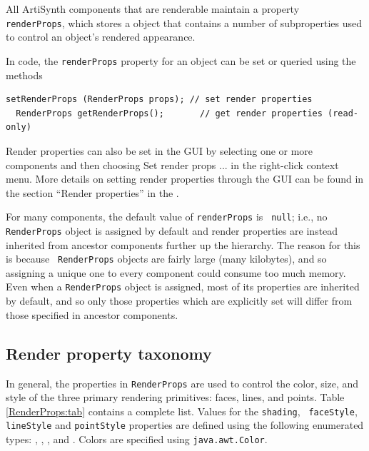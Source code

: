 All ArtiSynth components that are renderable maintain a property {\tt
renderProps}, which stores a
 object that contains a number
of subproperties used to control an object's rendered appearance.

In code, the {\tt renderProps} property for an object can be set or
queried using the methods
\begin{lstlisting}[]
  setRenderProps (RenderProps props); // set render properties
  RenderProps getRenderProps();       // get render properties (read-only)
\end{lstlisting}
%
Render properties can also be set in the GUI by selecting one or more
components and then choosing {\sf Set render props ...}  in the
right-click context menu. More details on setting render properties
through the GUI can be found in the section ``Render properties'' in the
.

For many components, the default value of {\tt renderProps} is {\tt
null}; i.e., no {\tt RenderProps} object is assigned by default and
render properties are instead inherited from ancestor components
further up the hierarchy. The reason for this is because {\tt
RenderProps} objects are fairly large (many kilobytes), and so
assigning a unique one to every component could consume too much
memory. Even when a {\tt RenderProps} object is assigned, most of its
properties are inherited by default, and so only those properties
which are explicitly set will differ from those specified in ancestor
components.

\subsection{Render property taxonomy}

In general, the properties in {\tt RenderProps} are used to control
the color, size, and style of the three primary rendering
primitives: faces, lines, and points. Table \ref{RenderProps:tab}
contains a complete list. Values for the {\tt shading}, {\tt
faceStyle}, {\tt lineStyle} and {\tt pointStyle} properties are
defined using the following enumerated types:
, 
, 
, 
and 
.
Colors are specified using {\tt java.awt.Color}.

